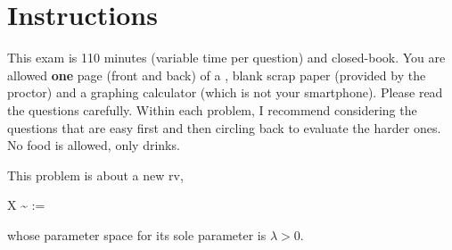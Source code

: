 \documentclass[12pt]{article}
\begin{document}
\section*{Instructions}
This exam is 110 minutes (variable time per question) and closed-book. You are allowed \textbf{one} page (front and back) of a , blank scrap paper (provided by the proctor) and a graphing calculator (which is not your smartphone). Please read the questions carefully. Within each problem, I recommend considering the questions that are easy first and then circling back to evaluate the harder ones. No food is allowed, only drinks. %

\pagebreak


\problem This problem is about a new rv,

\beqn
X \sim \poisson{\lambda} :=   
\eeqn

\noindent whose parameter space for its sole parameter is $\lambda > 0$.
\end{document}
